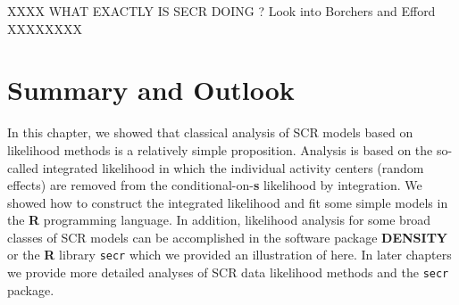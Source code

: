 {XXXX WHAT EXACTLY IS SECR DOING ? Look into Borchers and Efford
XXXXXXXX


\begin{comment}
\subsection{Analysis of Efford's Possum Data}

Demonstrates an explicit model misspecification.
Or maybe -- likelihood easy to apply to multinomial likelihood from
previous chapter which is probably what secr does (checking with efford)

Use the mask he provides (show picture)
Use rectangular mask.

Cite above material on state-space grid. Use our likelihood function
with his state-space grid.

Need to focus on a specific illustration here. I think using
secr to fit the basic model using the state-space grid or no
state-space
grid, and using our likelihood function, would be fine.
Thats 4 estimates. 

Secr + grid
secr + no grid -- really a fine grid I think 
my likelihood + secr grid
my likelihood + really fine grid

Note: should not compare AIC across analysis platforms because the
likelihoods can be scaled arbitrarily -- depending on what to leave in
or leave out.
\end{comment}


\section{Summary and Outlook}

In this chapter, we showed that classical analysis of SCR models based
on likelihood methods is a relatively simple proposition.  Analysis is
based on the so-called integrated likelihood in which the individual
activity centers (random effects) are removed from the
conditional-on-{\bf s} likelihood by integration. We showed how to construct
the integrated likelihood and fit some simple models in the {\bf R}
programming language.  In addition, likelihood analysis for some broad
classes of SCR models can be accomplished in the software package
{\bf DENSITY} 
or the {\bf R}
library \mbox{\tt secr} which we provided an illustration of here. In later
chapters we provide more detailed analyses of SCR data likelihood
methods and the
\mbox{\tt secr}
package.

}
